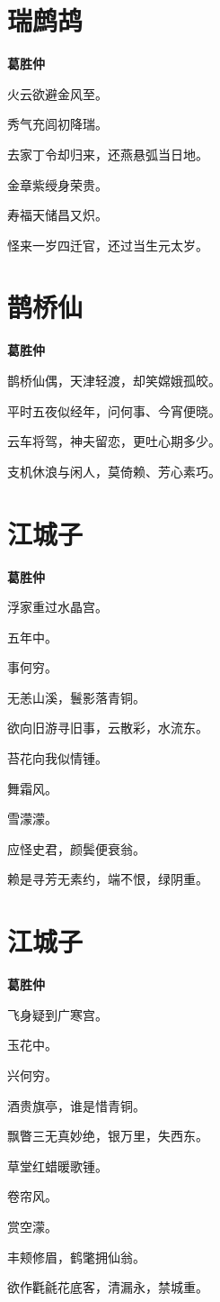 \documentclass[12pt,a4paper]{ctexbook}
\begin{document}
\section{瑞鹧鸪}
\textbf{葛胜仲}\par\vspace{0.5em}
火云欲避金风至。\par
秀气充闾初降瑞。\par
去家丁令却归来，还燕悬弧当日地。\par
金章紫绶身荣贵。\par
寿福天储昌又炽。\par
怪来一岁四迁官，还过当生元太岁。\par

\section{鹊桥仙}
\textbf{葛胜仲}\par\vspace{0.5em}
鹊桥仙偶，天津轻渡，却笑嫦娥孤皎。\par
平时五夜似经年，问何事、今宵便晓。\par
云车将驾，神夫留恋，更吐心期多少。\par
支机休浪与闲人，莫倚赖、芳心素巧。\par

\section{江城子}
\textbf{葛胜仲}\par\vspace{0.5em}
浮家重过水晶宫。\par
五年中。\par
事何穷。\par
无恙山溪，鬟影落青铜。\par
欲向旧游寻旧事，云散彩，水流东。\par
苔花向我似情锺。\par
舞霜风。\par
雪濛濛。\par
应怪史君，颜鬓便衰翁。\par
赖是寻芳无素约，端不恨，绿阴重。\par

\section{江城子}
\textbf{葛胜仲}\par\vspace{0.5em}
飞身疑到广寒宫。\par
玉花中。\par
兴何穷。\par
酒贵旗亭，谁是惜青铜。\par
飘瞥三无真妙绝，银万里，失西东。\par
草堂红蜡暖歌锺。\par
卷帘风。\par
赏空濛。\par
丰颊修眉，鹤氅拥仙翁。\par
欲作氍毹花底客，清漏永，禁城重。\par
\end{document}
